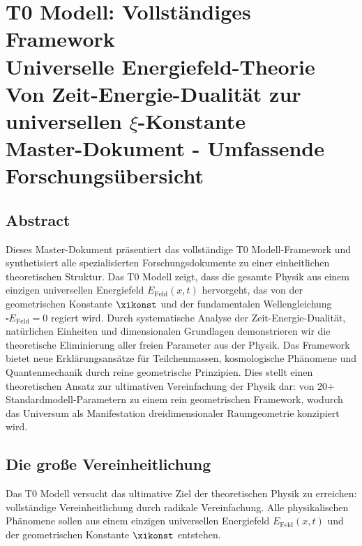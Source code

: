 \chapter{{ T0 Modell: Vollständiges Framework}\\
		{ Universelle Energiefeld-Theorie}\\
		{ Von Zeit-Energie-Dualität zur universellen $\xi$-Konstante}\\
		\vspace{1cm}
		{ Master-Dokument - Umfassende Forschungsübersicht}}


	
\section*{Abstract}
		Dieses Master-Dokument präsentiert das vollständige T0 Modell-Framework und synthetisiert alle spezialisierten Forschungsdokumente zu einer einheitlichen theoretischen Struktur. Das T0 Modell zeigt, dass die gesamte Physik aus einem einzigen universellen Energiefeld $E_{\text{Feld}}(x,t)$ hervorgeht, das von der geometrischen Konstante $\xikonst$ und der fundamentalen Wellengleichung $\square E_{\text{Feld}} = 0$ regiert wird. Durch systematische Analyse der Zeit-Energie-Dualität, natürlichen Einheiten und dimensionalen Grundlagen demonstrieren wir die theoretische Eliminierung aller freien Parameter aus der Physik. Das Framework bietet neue Erklärungsansätze für Teilchenmassen, kosmologische Phänomene und Quantenmechanik durch reine geometrische Prinzipien. Dies stellt einen theoretischen Ansatz zur ultimativen Vereinfachung der Physik dar: von 20+ Standardmodell-Parametern zu einem rein geometrischen Framework, wodurch das Universum als Manifestation dreidimensionaler Raumgeometrie konzipiert wird.


	
	\section{Die große Vereinheitlichung}
	
	\begin{revolutionaer}
		Das T0 Modell versucht das ultimative Ziel der theoretischen Physik zu erreichen: vollständige Vereinheitlichung durch radikale Vereinfachung. Alle physikalischen Phänomene sollen aus einem einzigen universellen Energiefeld $E_{\text{Feld}}(x,t)$ und der geometrischen Konstante $\xikonst$ entstehen.
	\end{revolutionaer}
	
